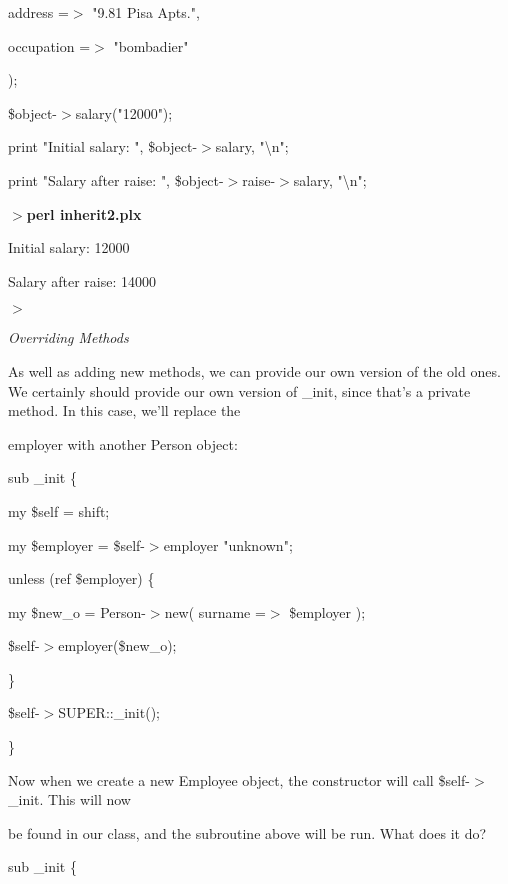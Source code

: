 \documentclass[a4paper,11pt]{book}
\begin{document}
\noindent address =$>$ "9.81 Pisa Apts.",

\noindent occupation =$>$ "bombadier"

\noindent );

\noindent 

\noindent \$object-$>$salary("12000");

\noindent print "Initial salary: ", \$object-$>$salary, "\textbackslash n";

\noindent print "Salary after raise: ", \$object-$>$raise-$>$salary, "\textbackslash n";

\noindent 

\noindent $>$\textbf{perl inherit2.plx}

\noindent Initial salary: 12000

\noindent Salary after raise: 14000

\noindent $>$

\noindent 

\noindent \textit{Overriding Methods}

\noindent As well as adding new methods, we can provide our own version of the old ones. We certainly should provide our own version of \_init, since that's a private method. In this case, we'll replace the

\noindent employer with another Person object:

\noindent 

\noindent 

\noindent sub \_init \{

\noindent my \$self = shift;

\noindent my \$employer = \$self-$>$employer \textbar \textbar  "unknown";

\noindent unless (ref \$employer) \{

\noindent my \$new\_o = Person-$>$new( surname =$>$ \$employer );

\noindent \$self-$>$employer(\$new\_o);

\noindent \}

\noindent \$self-$>$SUPER::\_init();

\noindent \}

\noindent 

\noindent Now when we create a new Employee object, the constructor will call \$self-$>$\_init. This will now

\noindent be found in our class, and the subroutine above will be run. What does it do?

\noindent 

\noindent sub \_init \{
\end{document}
